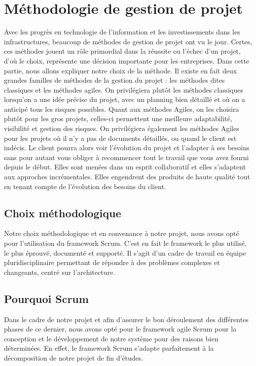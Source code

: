 \section{Méthodologie de gestion de projet}
Avec les progrès en technologie de l'information et les investissements dans les infrastructures, beaucoup de méthodes de gestion de projet ont vu le jour. Certes, ces méthodes jouent un rôle primordial dans la réussite ou l'échec d'un projet, d'où le choix, représente une décision importante pour les entreprises. Dans cette partie, nous allons expliquer notre choix de la méthode. Il existe en fait deux grandes familles de méthodes de la gestion du projet : les méthodes dites classiques et les méthodes agiles. On privilégiera plutôt les méthodes classiques lorsqu'on a une idée précise du projet, avec un planning bien détaillé et où on a anticipé tous les risques possibles. Quant aux méthodes Agiles, on les choisira plutôt pour les gros projets, celles-ci permettent une meilleure adaptabilité, visibilité et gestion des risques. On privilégiera également les méthodes Agiles pour les projets où il n'y a pas de documents détaillés, ou quand le client est indécis. Le client pourra alors voir l'évolution du projet et l'adapter à ses besoins sans pour autant vous obliger à recommencer tout le travail que vous avez fourni depuis le début. Elles sont menées dans un esprit collaboratif et elles s'adaptent aux approches incrémentales. Elles engendrent des produits de haute qualité tout en tenant compte de l'évolution des besoins du client.

\subsection{Choix méthodologique}
Notre choix méthodologique et en convenance à notre projet, nous avons opté pour l'utilisation du framework Scrum. C'est en fait le framework le plus utilisé, le plus éprouvé, documenté et supporté. Il s'agit d'un cadre de travail en équipe pluridisciplinaire permettant de répondre à des problèmes complexes et changeants, centré sur l'architecture.
\subsection{Pourquoi Scrum}
Dans le cadre de notre projet et afin d'assurer le bon déroulement des différentes phases de ce dernier, nous avons opté pour le framework agile Scrum pour la conception et le développement de notre système pour des raisons bien déterminées. En effet, le framework Scrum s'adapte parfaitement à la décomposition de notre projet de fin d'études.

